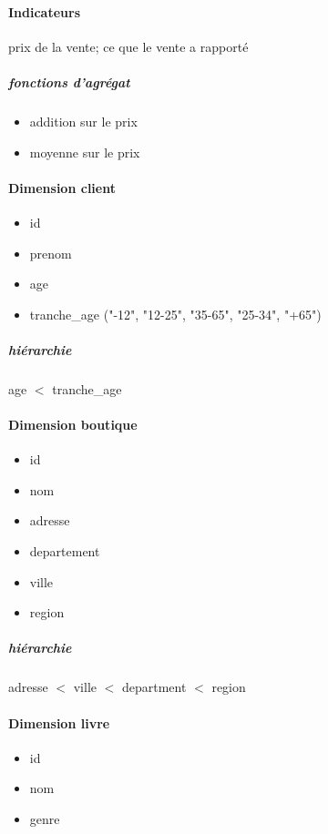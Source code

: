 \paragraph{Indicateurs}

prix de la vente; ce que le vente a rapporté

\subparagraph{fonctions d'agrégat}
\begin{itemize}
\item addition sur le prix
\item moyenne sur le prix
\end{itemize}


\paragraph{Dimension client}

\begin{itemize}
\item id
\item prenom
\item age
\item tranche\_age ("-12", "12-25", "35-65", "25-34", "+65")
\end{itemize}

\subparagraph{hiérarchie}
 age $<$ tranche\_age

\paragraph{Dimension boutique}
\begin{itemize}
\item id
\item nom
\item adresse
\item departement
\item ville
\item region
\end{itemize}

\subparagraph{hiérarchie}
adresse $<$ ville $<$ department $<$ region

\paragraph{Dimension livre}
\begin{itemize}
\item id
\item nom
\item genre
\end{itemize}

